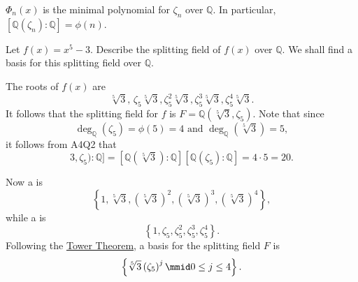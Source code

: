 \documentclass[notoc,notitlepage,nobib]{tufte-book}
\begin{document}
\begin{crly}\label{crly:cyclotomic_polynomials_are_minimal_polynomials_of_its_roots_over_q_}
  $\Phi_n(x)$ is the minimal polynomial for $\zeta_n$ over $\mathbb{Q}$. In particular, $[
  \mathbb{Q}(\zeta_n) : \mathbb{Q} ] = \phi(n)$.
\end{crly}

\begin{eg}
  Let $f(x) = x^5 - 3$. Describe the splitting field of $f(x)$ over $\mathbb{Q}$. We shall
  find a basis for this splitting field over $\mathbb{Q}$.

  The roots of $f(x)$ are
  \begin{equation*}
    \sqrt[5]{3}, \, \zeta_5 \sqrt[5]{3}, \zeta_5^2 \sqrt[5]{3}, \zeta_5^3
    \sqrt[5]{3}, \zeta_5^4 \sqrt[5]{3}.
  \end{equation*}
  It follows that the splitting field for $f$ is $F = \mathbb{Q}(\sqrt[5]{3},
  \zeta_5)$. Note that since
  \begin{equation*}
    \deg_{\mathbb{Q}}(\zeta_5) = \phi(5) = 4 \text{ and } \deg_{\mathbb{Q}}(\sqrt[5]{3}) =
    5,
  \end{equation*}
  it follows from A4Q2 that
  \begin{equation*}
    [ \mathbb{Q}(\sqrt[5]{3}, \zeta_5) : \mathbb{Q} ] = [ \mathbb{Q}(\sqrt[5]{3}) :
    \mathbb{Q} ][ \mathbb{Q}(\zeta_5) : \mathbb{Q} ] = 4 \cdot 5 = 20.
  \end{equation*}

  Now a  is
  \begin{equation*}
    \left\{ 1, \sqrt[5]{3}, \left( \sqrt[5]{3} \right)^2, \left( \sqrt[5]{3} \right)^3,
    \left( \sqrt[5]{3} \right)^4 \right\},
  \end{equation*}
  while a  is
  \begin{equation*}
    \left\{ 1, \zeta_5, \zeta_5^2, \zeta_5^3, \zeta_5^4 \right\}.
  \end{equation*}
  Following the \hyperref[thm:tower_theorem]{Tower Theorem}, a basis for the splitting
  field $F$ is
  \begin{equation}
    \left\{ \sqrt[5]{3} \left( \zeta_5 \right)^j \mmid 0 \leq j \leq 4
    \right\}.
  \end{equation}
\end{eg}

\end{document}
